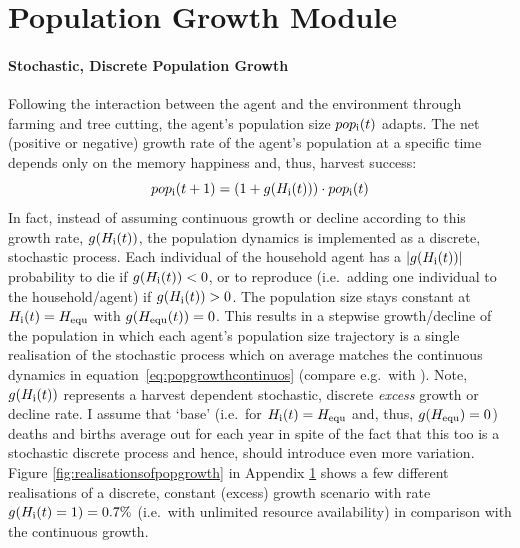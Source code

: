 \FloatBarrier
\section{Population Growth Module}\label{sec:PopGrowth}
\paragraph{Stochastic, Discrete Population Growth}
Following the interaction between the agent and the environment through farming and tree cutting, the agent's population size $pop_{\rm i}(t)$ adapts. 
The net (positive or negative) growth rate of the agent's population at a specific time depends only on the memory happiness and, thus, harvest success:
\begin{equation}\label{eq:popgrowthcontinuos}
pop_{\rm i}(t+1) = (1+g(H_{\rm i}(t))) \cdot pop_{\rm i}(t)
\end{equation}
In fact, instead of assuming continuous growth or decline according to this growth rate, $g(H_{\rm i}(t))$, the population dynamics is implemented as a discrete, stochastic process.
Each individual of the household agent has a $|g(H_{\rm i}(t))|$ probability to die if $g(H_{\rm i}(t))<0$, or %
to reproduce (i.e.\ adding one individual to the household/agent) if $g(H_{\rm i}(t))>0$.
The population size stays constant at $H_{\rm i}(t) = H_{\rm equ}$ with $g(H_{\rm equ}(t))=0$. 
This results in a stepwise growth/decline of the population in which each agent's population size trajectory is a single realisation of the stochastic process which on average matches the continuous dynamics in equation~\ref{eq:popgrowthcontinuos} (compare e.g.\ with \cite{Bungartz2009}).
Note, $g(H_{\rm i}(t))$ represents a harvest dependent stochastic, discrete \textit{excess} growth or decline rate. 
I assume that `base' (i.e.\ for $H_{\rm i}(t) = H_{\rm equ}$ and, thus, $g(H_{\rm equ})=0$) deaths and births average out for each year in spite of the fact that this too is a stochastic discrete process \citep{Bungartz2009} and hence, should introduce even more variation.
Figure \ref{fig:realisationsofpopgrowth} in Appendix \ref{sec:PopGrowth} shows a few different realisations of a discrete, constant (excess) growth scenario with rate $g(H_{\rm i}(t)=1)=0.7\%$ (i.e.\ with unlimited resource availability) in comparison with the continuous growth.

